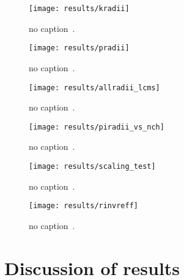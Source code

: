       \begin{figure}[h]
        \centering
        \centerline{\texttt{[image: results/kradii]}}
        \caption{no caption~\cite{galazyn}.}
      \label{fig:kradii}
      \end{figure}

      \begin{figure}[h]
        \centering
        \centerline{\texttt{[image: results/pradii]}}
        \caption{no caption~\cite{galazyn}.}
      \label{fig:pradii}
      \end{figure}    

      \begin{figure}[h]
        \centering
        \centerline{\texttt{[image: results/allradii\_lcms]}}
        \caption{no caption~\cite{galazyn}.}
      \label{fig:allradii}
      \end{figure}    

      \begin{figure}[h]
        \centering
        \centerline{\texttt{[image: results/piradii\_vs\_nch]}}
        \caption{no caption~\cite{galazyn}.}
      \label{fig:piradii}
      \end{figure}    

      \begin{figure}[h]
        \centering
        \centerline{\texttt{[image: results/scaling\_test]}}
        \caption{no caption~\cite{galazyn}.}
      \label{fig:piradii}
      \end{figure}    

      \begin{figure}[h]
        \centering
        \centerline{\texttt{[image: results/rinvreff]}}
        \caption{no caption~\cite{galazyn}.}
      \label{fig:piradii}
      \end{figure}


    \FloatBarrier
  \section{Discussion of results}

